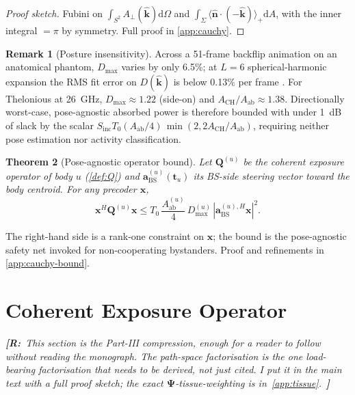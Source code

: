 \documentclass[journal,twocolumn,10pt]{IEEEtran}
\newtheorem{theorem}{Theorem}
\theoremstyle{definition}
\newtheorem{remark}[theorem]{Remark}
\newcommand{\robinnote}[1]{%
  {\color{red!75!black}\textit{\textbf{[R:}~#1~\textbf{]}}}}
\newcommand{\khat}{\hat{\bm{k}}}
\newcommand{\nhat}{\hat{\bm{n}}}
\newcommand{\xx}{\mathbf{x}}
\newcommand{\avec}{\mathbf{a}}
\newcommand{\Sinc}{S_{\mathrm{inc}}}
\newcommand{\Q}{\mathbf{Q}}
\newcommand{\diff}{\mathrm{d}}
\newcommand{\Aperp}{A_{\perp}}
\newcommand{\Aab}{A_{\mathrm{ab}}}
\begin{document}
\begin{proof}[Proof sketch]
Fubini on $\int_{S^2}\Aperp(\khat)\diff\Omega$ and $\int_\Sigma
\langle \nhat\cdot(-\khat)\rangle_+\diff A$, with the inner
integral $=\pi$ by symmetry. Full proof in
\cref{app:cauchy}.
\end{proof}

\begin{remark}[Posture insensitivity]\label{rem:posture}
Across a 51-frame backflip animation on an anatomical phantom,
$D_{\max}$ varies by only 6.5\%; at $L=6$ spherical-harmonic
expansion the RMS fit error on $D(\khat)$ is below 0.13\% per
frame \cite{WydaegheMonograph}. For Thelonious at 26~GHz,
$D_{\max}\approx 1.22$ (side-on) and
$A_{\mathrm{CH}}/\Aab\approx 1.38$. Directionally worst-case,
pose-agnostic absorbed power is therefore bounded with under 1~dB
of slack by the scalar
$\Sinc T_0 (\Aab/4)\,\min(2,2A_{\mathrm{CH}}/\Aab)$, requiring
neither pose estimation nor activity classification.
\end{remark}

\begin{theorem}[Pose-agnostic operator bound]\label{thm:cauchy-bound}
Let $\Q^{(u)}$ be the coherent exposure operator of body $u$
(\cref{def:Q}) and $\avec^{(u)}_{\mathrm{BS}}(\mathbf{t}_u)$ its
BS-side steering vector toward the body centroid.
For any precoder $\xx$,
\begin{equation}\label{eq:cauchy-bound-op}
  \xx^H\Q^{(u)}\xx \le
  T_0\,\frac{\Aab^{(u)}}{4}\,D_{\max}^{(u)}\,
  |\avec^{(u),H}_{\mathrm{BS}}\xx|^2.
\end{equation}
\end{theorem}

The right-hand side is a rank-one constraint on $\xx$; the bound
is the pose-agnostic safety net invoked for non-cooperating
bystanders. Proof and refinements in \cref{app:cauchy-bound}.

\section{Coherent Exposure Operator}\label{sec:operator}

\robinnote{This section is the Part-III compression, enough for
a reader to follow without reading the monograph. The path-space
factorisation is the one load-bearing factorisation that needs
to be derived, not just cited. I put it in the main text with
a full proof sketch; the exact $\mathbf{\Psi}$-tissue-weighting is
in~\cref{app:tissue}.}
\end{document}
